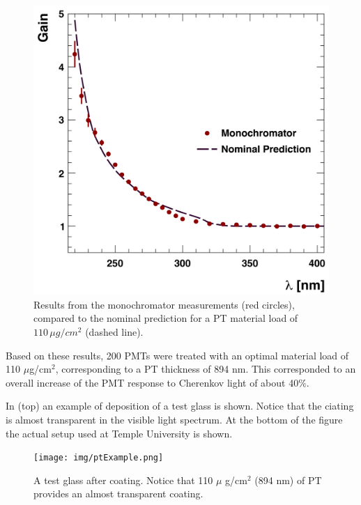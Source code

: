 \begin{figure}
	\centering
	\includegraphics[width=0.95\columnwidth,keepaspectratio]{img/ptQEResults.png}
	\caption{Results from the monochromator measurements (red circles), compared to the
				nominal prediction for a PT material load of
            $110\,\mu g/cm^2$ (dashed line).}
	\label{fig:ptQEResults}
\end{figure}

Based on these results, 200 PMTs were treated \cite{Joosten:2016lcl} with an optimal material load of 110 $\mu$g/cm$^2$,
corresponding to a PT thickness of 894 nm. This corresponded to an overall
increase of the PMT response to Cherenkov light of about 40\%.

In  (top) an example of deposition of a test glass is shown. Notice that the ciating is almost
transparent in the visible light spectrum. At the bottom of the figure the actual setup used at Temple
University is shown.

\begin{figure}
	\centering
	\texttt{[image: img/ptExample.png]}
	\caption{A test glass after coating. Notice that  110 $\mu$ g/cm$^2$ (894 nm) of PT provides an
            almost transparent coating.}
	\label{fig:ptExample}
\end{figure}




